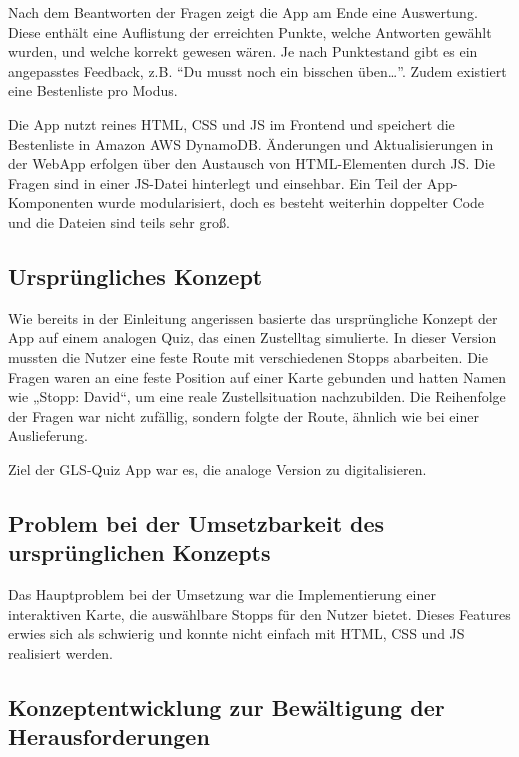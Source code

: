 \documentclass[biblatex]{lni}
\begin{document}
Nach dem Beantworten der Fragen zeigt die App am Ende eine Auswertung.
Diese enthält eine Auflistung der erreichten Punkte, welche Antworten gewählt wurden, und welche korrekt gewesen wären.
Je nach Punktestand gibt es ein angepasstes Feedback, z.B. “Du musst noch ein bisschen üben…”.
Zudem existiert eine Bestenliste pro Modus.

Die App nutzt reines \ac{HTML}, \ac{CSS} und \ac{JS} im Frontend und speichert die Bestenliste in Amazon AWS DynamoDB. \cite{GLSQS}
Änderungen und Aktualisierungen in der \ac{WebApp} erfolgen über den Austausch von \ac{HTML}-Elementen durch \ac{JS}.
Die Fragen sind in einer \ac{JS}-Datei hinterlegt und einsehbar.
Ein Teil der App-Komponenten wurde modularisiert,
doch es besteht weiterhin doppelter Code und die Dateien sind teils sehr groß.

\subsection{Ursprüngliches Konzept}

Wie bereits in der Einleitung angerissen basierte das ursprüngliche Konzept der App auf einem analogen Quiz,
das einen Zustelltag simulierte.
In dieser Version mussten die Nutzer eine feste Route mit verschiedenen Stopps abarbeiten.
Die Fragen waren an eine feste Position auf einer Karte gebunden und hatten Namen wie „Stopp: David“,
um eine reale Zustellsituation nachzubilden.
Die Reihenfolge der Fragen war nicht zufällig, sondern folgte der Route, ähnlich wie bei einer Auslieferung.

Ziel der GLS-Quiz App war es, die analoge Version zu digitalisieren.

\subsection{Problem bei der Umsetzbarkeit des ursprünglichen Konzepts}

Das Hauptproblem bei der Umsetzung war die Implementierung einer interaktiven Karte,
die auswählbare Stopps für den Nutzer bietet.
Dieses Features erwies sich als schwierig und konnte nicht einfach mit \ac{HTML}, \ac{CSS} und \ac{JS} realisiert werden.

\subsection{Konzeptentwicklung zur Bewältigung der Herausforderungen}
\end{document}
